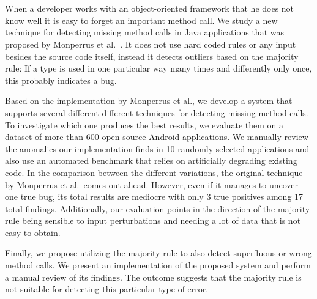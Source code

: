 \chapter{\abstractname}

When a developer works with an object-oriented framework that he does not know well it is easy to forget an important method call.
We study a new technique for detecting missing method calls in Java applications that was proposed by Monperrus et al.~\cite{monperrus2010detecting}.
It does not use hard coded rules or any input besides the source code itself, instead it detects outliers based on the majority rule:
If a type is used in one particular way many times and differently only once, this probably indicates a bug.

Based on the implementation by Monperrus et al., we develop a system that supports several different different techniques for detecting missing method calls.
To investigate which one produces the best results, we evaluate them on a dataset of more than 600 open source Android applications.
We manually review the anomalies our implementation finds in 10 randomly selected applications and also use an automated benchmark that relies on artificially degrading existing code.
In the comparison between the different variations, the original technique by Monperrus et al.\ comes out ahead.
However, even if it manages to uncover one true bug, its total results are mediocre with only 3 true positives among 17 total findings.
Additionally, our evaluation points in the direction of the majority rule being sensible to input perturbations and needing a lot of data that is not easy to obtain.

Finally, we propose utilizing the majority rule to also detect superfluous or wrong method calls.
We present an implementation of the proposed system and perform a manual review of its findings.
The outcome suggests that the majority rule is not suitable for detecting this particular type of error.

